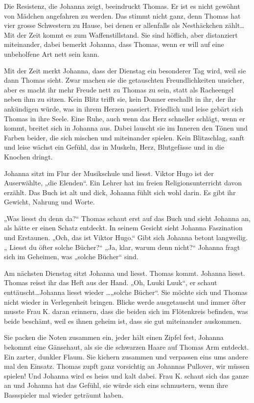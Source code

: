 \documentclass[10pt,a5paper]{book}
\begin{document}
Die Resistenz, die Johanna zeigt, beeindruckt Thomas. Er ist es nicht gewöhnt von Mädchen angefahren zu werden. Das stimmt nicht ganz, denn Thomas hat vier grosse Schwestern zu Hause, bei denen er allenfalls als Nesthäckchen zählt\dots  Mit der Zeit kommt es zum Waffenstillstand. Sie sind höflich, aber distanziert miteinander, dabei bemerkt Johanna, dass Thomas, wenn er will auf eine unbeholfene Art nett sein kann.

Mit der Zeit merkt Johanna, dass der Dienstag ein besonderer Tag wird, weil sie dann Thomas sieht. Zwar machen sie die getauschten Freundlichkeiten unsicher, aber es macht ihr mehr Freude nett zu Thomas zu sein, statt als Racheengel neben ihm zu sitzen. Kein Blitz trifft sie, kein Donner erschallt in ihr, der ihr ankündigen würde, was in ihrem Herzen passiert. Friedlich und leise gebärt sich Thomas in ihre Seele. Eine Ruhe, auch wenn das Herz schneller schlägt, wenn er kommt, breitet sich in Johanna aus. Dabei lauscht sie im Inneren den Tönen und Farben beider, die sich mischen und miteinander spielen. Kein Blitzschlag, sanft und leise wächst ein Gefühl, das in Muskeln, Herz, Blutgefässe und in die Knochen dringt.

Johanna sitzt im Flur der Musikschule und liesst. Viktor Hugo ist der Auserwählte, „die Elenden“. Ein Lehrer hat im freien Religionsunterricht davon erzählt. Das Buch ist alt und dick, Johanna fühlt sich wohl darin. Es gibt ihr Gewicht, Nahrung und Worte.

 „Was liesst du denn da?“ Thomas schaut erst auf das Buch und sieht Johanna an, als hätte er einen Schatz entdeckt. In seinem Gesicht sieht Johanna Faszination und Erstaunen. „Och, das ist Viktor Hugo.“ Gibt sich Johanna betont langweilig. „ Liesst du öfter solche Bücher?“  „Ja, klar, warum denn nicht?“ Johanna fragt sich im Geheimen, was „solche Bücher“ sind. 
 
Am nächsten Dienstag sitzt Johanna und liesst. Thomas kommt. Johanna liesst. Thomas reisst ihr das Heft aus der Hand. „Oh, Luuki Luuk“, er schaut enttäuscht\dots  Johanna liesst wieder \dots „solche Bücher“. Sie möchte sich und Thomas nicht wieder in Verlegenheit bringen. 
Blicke werde ausgetauscht und immer öfter musste Frau K. daran erinnern, dass die beiden sich im Flötenkreis befinden, was beide beschämt, weil es ihnen geheim ist, dass sie gut miteinander auskommen.

Sie packen die Noten zusammen ein, jeder hält einen Zipfel fest, Johanna bekommt eine Gänsehaut, als sie die schwarzen Haare auf Thomas Arm entdeckt. Ein zarter, dunkler Flaum. Sie kichern zusammen und verpassen eins ums andere mal den Einsatz. Thomas zupft ganz vorsichtig an Johannas Pullover, wir müssen spielen! Und Johanna wird es heiss und kalt dabei. Frau K. schaut sich das ganze an und Johanna hat das Gefühl, sie würde sich eins schmustern, wenn ihre Bassspieler mal wieder geträumt haben. 
\end{document}
